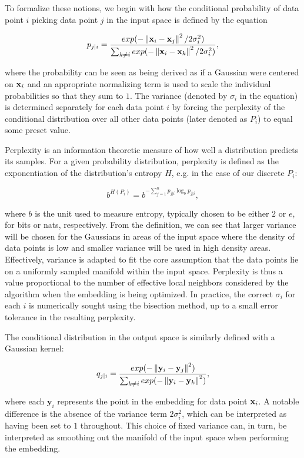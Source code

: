 To formalize these notions, we begin with how the conditional probability of data point $i$ picking data point $j$ in the input space is defined by the equation

\begin{equation}
p_{j \vert i} = \frac{exp(-\left\lVert\mathbf{x}_i - \mathbf{x}_j\right\rVert^2 / 2 \sigma_i^2)}{\sum_{k \neq i} exp(-\left\lVert\mathbf{x}_i - \mathbf{x}_k\right\rVert^2 / 2 \sigma_i^2)},
\label{eq:p_j_c_i}
\end{equation}

where the probability can be seen as being derived as if a Gaussian were centered on $\mathbf{x}_i$ and an appropriate normalizing term is used to scale the individual probabilities so that they sum to $1$. The variance (denoted by $\sigma_i$ in the equation) is determined separately for each data point $i$ by forcing the perplexity of the conditional distribution over all other data points (later denoted as $P_i$) to equal some preset value.

Perplexity is an information theoretic measure of how well a distribution predicts its samples. For a given probability distribution, perplexity is defined as the exponentiation of the distribution's entropy $H$, e.g. in the case of our discrete $P_i$:

$$b^{H(P_i)} = b^{-\sum_{j=1}^{n} p_{j \vert i} \log_b p_{j \vert i}},$$

where $b$ is the unit used to measure entropy, typically chosen to be either $2$ or $e$, for bits or nats, respectively. From the definition, we can see that larger variance will be chosen for the Gaussians in areas of the input space where the density of data points is low and smaller variance will be used in high density areas. Effectively, variance is adapted to fit the core assumption that the data points lie on a uniformly sampled manifold within the input space. Perplexity is thus a value proportional to the number of effective local neighbors considered by the algorithm when the embedding is being optimized. In practice, the correct $\sigma_i$ for each $i$ is numerically sought using the bisection method, up to a small error tolerance in the resulting perplexity.

The conditional distribution in the output space is similarly defined with a Gaussian kernel:

$$q_{j \vert i} = \frac{exp(-\left\lVert\mathbf{y}_i - \mathbf{y}_j\right\rVert^2)}{\sum_{k \neq i} exp(-\left\lVert\mathbf{y}_i - \mathbf{y}_k\right\rVert^2)},$$

where each $\mathbf{y}_i$ represents the point in the embedding for data point $\mathbf{x}_i$. A notable difference is the absence of the variance term $2 \sigma_i^2$, which can be interpreted as having been set to $1$ throughout. This choice of fixed variance can, in turn, be interpreted as smoothing out the manifold of the input space when performing the embedding.

